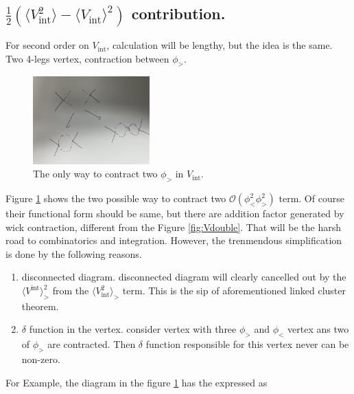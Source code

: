 \documentclass[12pt,halfline,a4paper]{ouparticle}
\begin{document}
\subsection {$\frac{1}{2}(\langle V^2_\text{int} \rangle-\langle V_\text{int} \rangle^2)$ contribution.}
\label{sec:v2}
For second order on $V_\text{int}$, calculation will be lengthy, but the idea is the same. Two 4-legs vertex, contraction between $\phi_>$.
\begin{figure}[h!]
	\centering
	\includegraphics[width=0.4\textwidth]{Fig4.jpeg}
	\caption{The only way to contract two $\phi_>$ in $V_\text{int}$.}
	\label{fig:Vdoubledouble}
\end{figure}
Figure \ref{fig:Vdoubledouble} shows the two possible way to contract two $\mathcal{O}(\phi_<^2\phi_>^2)$ term. Of course their functional form should be same, but there are addition factor generated by wick contraction, different from the Figure \ref{fig:Vdouble}.
That will be the harsh road to combinatorics and integration. However, the trenmendous simplification is done by the following reasons.
\begin{enumerate}
	\item disconnected diagram. disconnected diagram will clearly cancelled out by the $\langle V^\text{int} \rangle_>^2$ from the $\langle V_\text{int}^2 \rangle_>$ term. This is the sip of aforementioned linked cluster theorem.
	\item $\delta$ function in the vertex. consider vertex with three $\phi_>$ and $\phi_<$ vertex ans two of $\phi_>$ are contracted. Then $\delta$ function responsible for this vertex never can be non-zero. 
\end{enumerate}
For Example, the diagram in the figure \ref{fig:Vdoubledouble} has the expressed as
\end{document}
